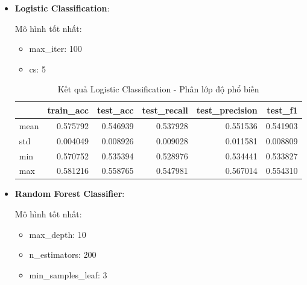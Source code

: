     \begin{itemize}
        \item \textbf{Logistic Classification}: 
        
            Mô hình tốt nhất:
            \begin{itemize}
                \item max\_iter: 100
                \item cs: 5
            \end{itemize}

            \begin{table}[htbp]
            \centering
            \caption{Kết quả Logistic Classification - Phân lớp độ phổ biến}
            \label{tab:mal-member-LogCV}
            \begin{tabular}{lrrrrr}
                \hline
                & train\_acc & test\_acc & test\_recall & test\_precision & test\_f1 \\
                \hline
                mean & 0.575792 & 0.546939 & 0.537928 & 0.551536 & 0.541903 \\
                std & 0.004049 & 0.008926 & 0.009028 & 0.011581 & 0.008809 \\
                min & 0.570752 & 0.535394 & 0.528976 & 0.534441 & 0.533827 \\
                max & 0.581216 & 0.558765 & 0.547981 & 0.567014 & 0.554310 \\
                \hline
            \end{tabular}
            \end{table}
  
            
            \FloatBarrier
            
        \item \textbf{Random Forest Classifier}:

            Mô hình tốt nhất:
            \begin{itemize}
                \item max\_depth: 10
                \item n\_estimators: 200
                \item min\_samples\_leaf: 3
            \end{itemize}


\end{itemize}
